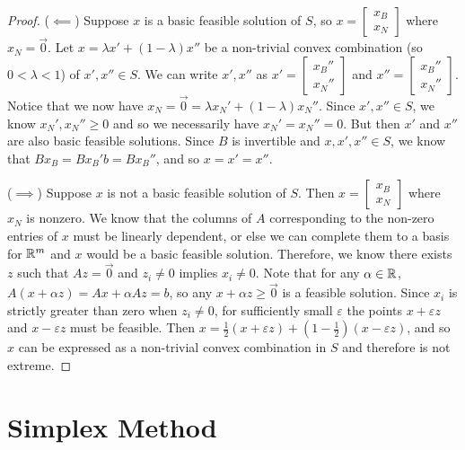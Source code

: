 \begin{proof}\proofbreak
    ($\impliedby$) Suppose $x$ is a basic feasible solution of $S$, so $x = \begin{bmatrix}
        x_B \\ x_N
    \end{bmatrix}$ where $x_N = \vec{0}$. Let $x = \lambda x' + (1 - \lambda) x''$ be a non-trivial convex combination (so $0 < \lambda < 1$) of $x', x'' \in S$. We can write $x', x''$ as $x' = \begin{bmatrix} x_B'' \\ x_N'' \end{bmatrix}$ and $x'' = \begin{bmatrix} x_B'' \\ x_N'' \end{bmatrix}$. Notice that we now have $x_N = \vec{0} = \lambda x_N' + (1 - \lambda)x_N''$. Since $x', x'' \in S$, we know $x_N', x_N'' \geq 0$ and so we necessarily have $x_N' = x_N'' = 0$. But then $x'$ and $x''$ are also basic feasible solutions. Since $B$ is invertible and $x, x', x'' \in S$, we know that $Bx_B = Bx_B'b = Bx_B''$, and so $x = x' = x''$.

    ($\implies$) Suppose $x$ is not a basic feasible solution of $S$. Then $x = \begin{bmatrix}
        x_B \\ x_N
    \end{bmatrix}$ where $x_N$ is nonzero. We know that the columns of $A$ corresponding to the non-zero entries of $x$ must be linearly dependent, or else we can complete them to a basis for $\mathbb{R}^m$ and $x$ would be a basic feasible solution. Therefore, we know there exists $z$ such that $Az = \vec{0}$ and $z_i \neq 0$ implies $x_i \neq 0$. Note that for any $\alpha \in \mathbb{R}$, $A(x + \alpha z) = Ax + \alpha Az = b$, so any $x + \alpha z \geq \vec{0}$ is a feasible solution. Since $x_i$ is strictly greater than zero when $z_i \neq 0$, for sufficiently small $\varepsilon$ the points $x + \varepsilon z$ and $x - \varepsilon z$ must be feasible. Then $x = \frac{1}{2}\left(x + \varepsilon z\right) + \left(1 - \frac{1}{2}\right)\left(x - \varepsilon z\right)$, and so $x$ can be expressed as a non-trivial convex combination in $S$ and therefore is not extreme.
\end{proof}

\section{Simplex Method}

